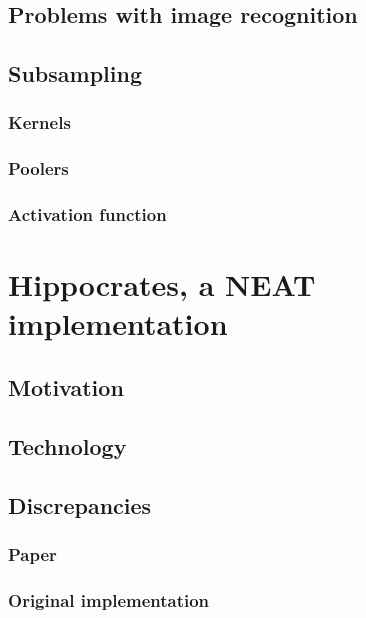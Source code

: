\documentclass[11pt]{article}
\begin{document}
		\subsection{Problems with image recognition}
			
		\subsection{Subsampling}
			
			\subsubsection{Kernels}
			
			\subsubsection{Poolers}
			
			\subsubsection{Activation function}
			
	\newpage

	\section{Hippocrates, a NEAT implementation}
		\subsection{Motivation}
			
		\subsection{Technology}
			
		\subsection{Discrepancies}
			\subsubsection{Paper}
				
			\subsubsection{Original implementation}
				
\end{document}
